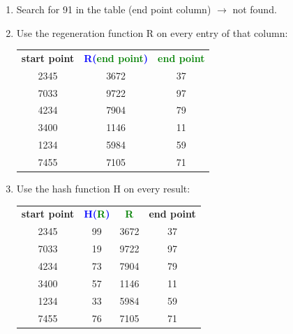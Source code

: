 \begin{enumerate}[(a)]
\begin{itemize}
\begin{enumerate}[1.]
\begin{enumerate}[{2}.1]
                    \item Search for 91 in the table (end point column) $\rightarrow$ not found.
                    \item Use the regeneration function R on every entry of that column:
                    \\{%
                    \begin{tabular}{c c c}
                        \textbf{start point} & \textbf{\textcolor{blue}{R(\textcolor{green}{end point})}} & \textbf{\textcolor{green}{end point}} \\
                        2345 & 3672 & 37 \\
                        7033 & 9722 & 97 \\
                        4234 & 7904 & 79 \\
                        3400 & 1146 & 11 \\
                        1234 & 5984 & 59 \\
                        7455 & 7105 & 71 
                    \end{tabular}
                    } 
                    
                    \item Use the hash function H on every result:
                    \\{%
                    \begin{tabular}{c c c c}
                        \textbf{start point} & \textbf{\textcolor{blue}{H(\textcolor{green}{R})}} & \textbf{\textcolor{green}{R}} & \textbf{end point} \\
                        2345 & 99 & 3672 & 37 \\
                        7033 & 19 & 9722 & 97 \\
                        4234 & 73 & 7904 & 79 \\
                        3400 & 57 & 1146 & 11 \\
                        1234 & 33 & 5984 & 59 \\
                        7455 & 76 & 7105 & 71 
                    \end{tabular}
                    } 
                    

\end{enumerate}
\end{enumerate}
\end{itemize}
\end{enumerate}
